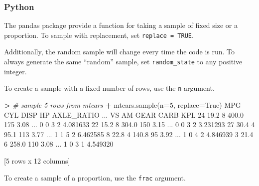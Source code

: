 \documentclass[
]{book}
\newenvironment{Shaded}{\begin{snugshade}}{\end{snugshade}}
\newcommand{\CommentTok}[1]{\textcolor[rgb]{0.56,0.35,0.01}{\textit{#1}}}
\newcommand{\DecValTok}[1]{\textcolor[rgb]{0.00,0.00,0.81}{#1}}
\newcommand{\FloatTok}[1]{\textcolor[rgb]{0.00,0.00,0.81}{#1}}
\newcommand{\NormalTok}[1]{#1}
\newcommand{\OperatorTok}[1]{\textcolor[rgb]{0.81,0.36,0.00}{\textbf{#1}}}
\newcommand{\VariableTok}[1]{\textcolor[rgb]{0.00,0.00,0.00}{#1}}
\begin{document}
\hypertarget{python-26}{%
\subsubsection*{Python}\label{python-26}}

The pandas package provide a function for taking a sample of fixed size or a proportion. To sample with replacement, set \texttt{replace\ =\ TRUE}.

Additionally, the random sample will change every time the code is run. To always generate the same ``random'' sample, set \texttt{random\_state} to any positive integer.

To create a sample with a fixed number of rows, use the \texttt{n} argument.

\begin{Shaded}
\begin{Highlighting}[]
\OperatorTok{\textgreater{}} \CommentTok{\# sample 5 rows from mtcars}
\OperatorTok{+}\NormalTok{ mtcars.sample(n}\OperatorTok{=}\DecValTok{5}\NormalTok{, replace}\OperatorTok{=}\VariableTok{True}\NormalTok{)}
\NormalTok{     MPG  CYL   DISP   HP  AXLE\_RATIO  ...  VS  AM  GEAR CARB       KPL}
\DecValTok{24}  \FloatTok{19.2}    \DecValTok{8}  \FloatTok{400.0}  \DecValTok{175}        \FloatTok{3.08}\NormalTok{  ...   }\DecValTok{0}   \DecValTok{0}     \DecValTok{3}    \DecValTok{2}  \FloatTok{4.081633}
\DecValTok{22}  \FloatTok{15.2}    \DecValTok{8}  \FloatTok{304.0}  \DecValTok{150}        \FloatTok{3.15}\NormalTok{  ...   }\DecValTok{0}   \DecValTok{0}     \DecValTok{3}    \DecValTok{2}  \FloatTok{3.231293}
\DecValTok{27}  \FloatTok{30.4}    \DecValTok{4}   \FloatTok{95.1}  \DecValTok{113}        \FloatTok{3.77}\NormalTok{  ...   }\DecValTok{1}   \DecValTok{1}     \DecValTok{5}    \DecValTok{2}  \FloatTok{6.462585}
\DecValTok{8}   \FloatTok{22.8}    \DecValTok{4}  \FloatTok{140.8}   \DecValTok{95}        \FloatTok{3.92}\NormalTok{  ...   }\DecValTok{1}   \DecValTok{0}     \DecValTok{4}    \DecValTok{2}  \FloatTok{4.846939}
\DecValTok{3}   \FloatTok{21.4}    \DecValTok{6}  \FloatTok{258.0}  \DecValTok{110}        \FloatTok{3.08}\NormalTok{  ...   }\DecValTok{1}   \DecValTok{0}     \DecValTok{3}    \DecValTok{1}  \FloatTok{4.549320}

\NormalTok{[}\DecValTok{5}\NormalTok{ rows x }\DecValTok{12}\NormalTok{ columns]}
\end{Highlighting}
\end{Shaded}

To create a sample of a proportion, use the \texttt{frac} argument.
\end{document}
